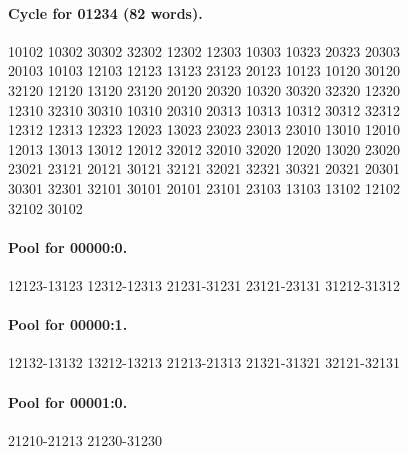 \documentclass[11pt]{article}
\numberwithin{equation}{section}
\numberwithin{table}{section}
\begin{document}
\paragraph{Cycle for 01234 (82 words).}
\begingroup\footnotesize\ttfamily\begin{flushleft}
10102 10302 30302 32302 12302 12303 10303 10323 20323 20303\\
20103 10103 12103 12123 13123 23123 20123 10123 10120 30120\\
32120 12120 13120 23120 20120 20320 10320 30320 32320 12320\\
12310 32310 30310 10310 20310 20313 10313 10312 30312 32312\\
12312 12313 12323 12023 13023 23023 23013 23010 13010 12010\\
12013 13013 13012 12012 32012 32010 32020 12020 13020 23020\\
23021 23121 20121 30121 32121 32021 32321 30321 20321 20301\\
30301 32301 32101 30101 20101 23101 23103 13103 13102 12102\\
32102 30102\\
\end{flushleft}\endgroup
\paragraph{Pool for 00000:0.}
\begingroup\footnotesize\ttfamily\begin{flushleft}
12123-13123 12312-12313 21231-31231 23121-23131 31212-31312\\
\end{flushleft}\endgroup
\paragraph{Pool for 00000:1.}
\begingroup\footnotesize\ttfamily\begin{flushleft}
12132-13132 13212-13213 21213-21313 21321-31321 32121-32131\\
\end{flushleft}\endgroup
\paragraph{Pool for 00001:0.}
\begingroup\footnotesize\ttfamily\begin{flushleft}
21210-21213 21230-31230\\
\end{flushleft}\endgroup
\end{document}
